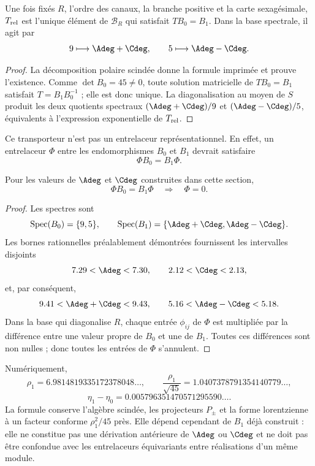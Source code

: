 \begin{proposition}
\label{p3-20260826:prop:transportador-relativo-split}
Une fois fixés \(R\), l'ordre des canaux, la branche positive et la carte
sexagésimale, \(T_{\rm rel}\) est l'unique élément de
\(\mathscr B_R\) qui satisfait \(TB_0=B_1\). Dans la base spectrale, il agit par
\[
 9\longmapsto\Adeg+\Cdeg,
 \qquad
 5\longmapsto\Adeg-\Cdeg.
\]
\end{proposition}

\begin{proof}
La décomposition polaire scindée donne la formule imprimée et prouve l'existence.
Comme \(\det B_0=45\ne0\), toute solution matricielle de \(TB_0=B_1\) satisfait
\(T=B_1B_0^{-1}\) ; elle est donc unique. La diagonalisation au moyen de \(S\)
produit les deux quotients spectraux
\((\Adeg+\Cdeg)/9\) et \((\Adeg-\Cdeg)/5\), équivalents à l'expression
exponentielle de \(T_{\rm rel}\).
\end{proof}

Ce transporteur n'est pas un entrelaceur représentationnel. En effet, un
entrelaceur \(\Phi\) entre les endomorphismes \(B_0\) et \(B_1\) devrait
satisfaire
\[
 \Phi B_0=B_1\Phi.
\]

\begin{theorem}
\label{p3-20260826:thm:no-go-entrelazador-bloques-split}
Pour les valeurs de \(\Adeg\) et \(\Cdeg\) construites dans cette section,
\[
 \boxed{\Phi B_0=B_1\Phi\quad\Longrightarrow\quad\Phi=0.}
\]
\end{theorem}

\begin{proof}
Les spectres sont
\[
 \operatorname{Spec}(B_0)=\{9,5\},
 \qquad
 \operatorname{Spec}(B_1)
 =\{\Adeg+\Cdeg,\Adeg-\Cdeg\}.
\]
Les bornes rationnelles préalablement démontrées fournissent les intervalles
disjoints
\[
 7.29<\Adeg<7.30,
 \qquad
 2.12<\Cdeg<2.13,
\]
et, par conséquent,
\[
 9.41<\Adeg+\Cdeg<9.43,
 \qquad
 5.16<\Adeg-\Cdeg<5.18.
\]
Dans la base qui diagonalise \(R\), chaque entrée \(\phi_{ij}\) de \(\Phi\)
est multipliée par la différence entre une valeur propre de \(B_0\) et une de
\(B_1\). Toutes ces différences sont non nulles ; donc toutes les entrées de
\(\Phi\) s'annulent.
\end{proof}

Numériquement,
\[
 \rho_1=6.9814819335172378048\ldots,
 \qquad
 \frac{\rho_1}{\sqrt{45}}=1.0407378791354140779\ldots,
\]
\[
 \eta_1-\eta_0
 =0.005796351470571295590\ldots.
\]
La formule conserve l'algèbre scindée, les projecteurs \(P_\pm\) et la forme
lorentzienne à un facteur conforme \(\rho_1^2/45\) près. Elle dépend cependant
de \(B_1\) déjà construit : elle ne constitue pas une dérivation antérieure de
\(\Adeg\) ou \(\Cdeg\) et ne doit pas être confondue avec les entrelaceurs
équivariants entre réalisations d'un même module.

